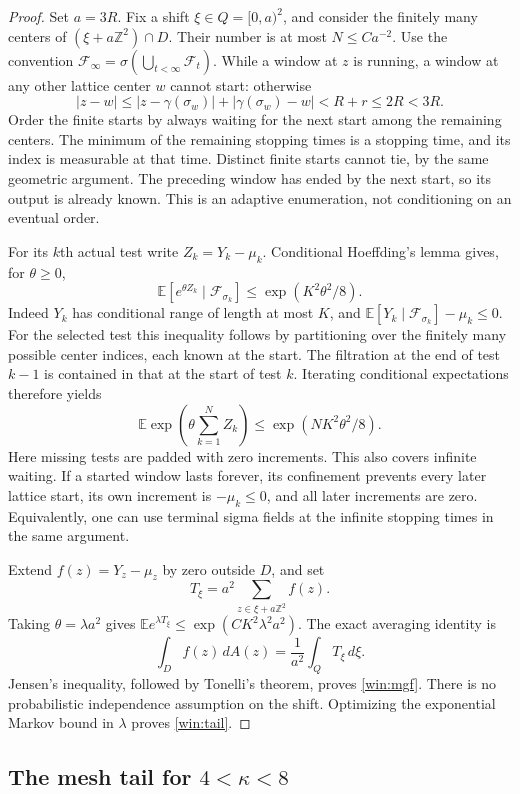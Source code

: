 \begin{proof}
Set $a=3R$.  Fix a shift $\xi\in Q=[0,a)^2$, and consider the finitely
many centers of $(\xi+a\mathbb Z^2)\cap D$.  Their number is at most
$N\le C a^{-2}$.  Use the convention
$\mathcal F_\infty=\sigma(\bigcup_{t<\infty}\mathcal F_t)$.
While a window at $z$ is running, a window at any
other lattice center $w$ cannot start: otherwise
\[
 |z-w|\le |z-\gamma(\sigma_w)|+|\gamma(\sigma_w)-w|
          <R+r\le2R<3R.
\]
Order the finite starts by always waiting for the next start among the
remaining centers.  The minimum of the remaining stopping times is a
stopping time, and its index is measurable at that time.  Distinct finite
starts cannot tie, by the same geometric argument.  The preceding
window has ended by the next start, so its output is already known.
This is an adaptive enumeration, not conditioning on an eventual order.

For its $k$th actual test write $Z_k=Y_k-\mu_k$.  Conditional Hoeffding's
lemma gives, for $\theta\ge0$,
\[
 \mathbb E[e^{\theta Z_k}\mid\mathcal F_{\sigma_k}]
 \le \exp(K^2\theta^2/8).
\]
Indeed $Y_k$ has conditional range of length at most $K$, and
$\mathbb E[Y_k\mid\mathcal F_{\sigma_k}]-\mu_k\le0$.
For the selected test this inequality follows by partitioning over
the finitely many possible center indices, each known at the start.
The filtration at the end of test $k-1$ is contained in that at the
start of test $k$.  Iterating conditional expectations therefore yields
\[
 \mathbb E\exp\left(\theta\sum_{k=1}^{N}Z_k\right)
       \le \exp(NK^2\theta^2/8).
\]
Here missing tests are padded with zero increments.  This also covers
infinite waiting.  If a started window lasts forever, its confinement
prevents every later lattice start, its own increment is $-\mu_k\le0$,
and all later increments are zero.  Equivalently, one can use terminal
sigma fields at the infinite stopping times in the same argument.

Extend $f(z)=Y_z-\mu_z$ by zero outside $D$, and set
\[
 T_\xi=a^2\sum_{z\in\xi+a\mathbb Z^2}f(z).
\]
Taking $\theta=\lambda a^2$ gives
$\mathbb E e^{\lambda T_\xi}\le\exp(CK^2\lambda^2a^2)$.
The exact averaging identity is
\[
 \int_D f(z)\,dA(z)=\frac1{a^2}\int_Q T_\xi\,d\xi.
\]
Jensen's inequality, followed by Tonelli's theorem, proves
\eqref{win:mgf}.  There is no probabilistic independence assumption
on the shift.  Optimizing the exponential Markov bound in $\lambda$
proves \eqref{win:tail}.
\end{proof}

\subsection{The mesh tail for
\texorpdfstring{$4<\kappa<8$}{kappa between four and eight}}

